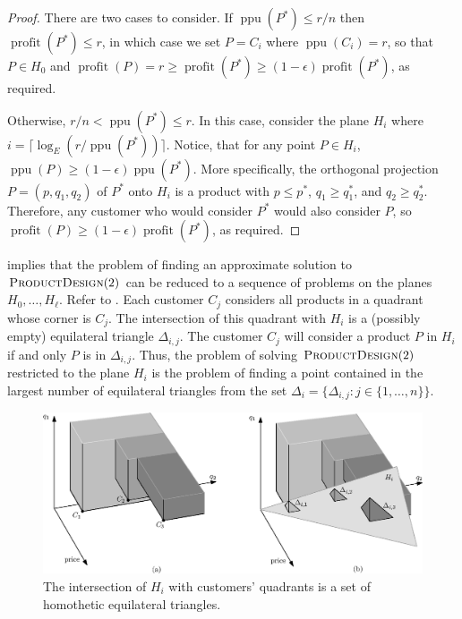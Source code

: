 \documentclass[lotsofwhite]{patmorin}
\newcommand{\ppu}{\operatorname{ppu}}
\newcommand{\val}{\operatorname{profit}}
\newcommand{\eps}{\epsilon}
\begin{document}
\begin{proof}
  There are two cases to consider.  If $\ppu(P^*) \le r/n$ then $\val(P^*)
  \le r$, in which case we set $P=C_i$ where $\ppu(C_i) = r$, so that
  $P\in H_0$ and $\val(P) = r \ge \val(P^*)\ge (1-\eps)\val(P^*)$,
  as required.

  Otherwise, $r/n < \ppu(P^*) \le r$.  In this case, consider the
  plane $H_i$ where $i = \lceil\log_E (r/\ppu(P^*))\rceil$.  Notice,
  that for any point $P\in H_i$, $\ppu(P) \ge (1-\eps)\ppu(P^*)$.
  More specifically, the orthogonal projection $P=(p,q_1,q_2)$ of $P^*$
  onto $H_i$ is a product with $p\le p^*$, $q_1\ge q_1^*$, and $q_2\ge
  q_2^*$.  Therefore, any customer who would consider $P^*$ would also
  consider $P$, so $\val(P) \ge (1-\eps)\val(P^*)$, as required.
\end{proof}

 implies that the problem of finding an approximate
solution to  $\textsc{ProductDesign}(2)$ can be reduced to a sequence of
problems on the planes $H_0,\ldots,H_\ell$.  Refer to . Each
customer $C_j$ considers all products in a quadrant whose corner is $C_j$.
The intersection of this quadrant with $H_i$ is a (possibly empty)
equilateral triangle $\Delta_{i,j}$.  The customer $C_j$ will consider
a product $P$ in $H_i$ if and only $P$ is in $\Delta_{i,j}$.  Thus,
the problem of solving $\textsc{ProductDesign}(2)$ restricted to the
plane $H_i$ is the problem of finding a point contained in the largest
number of equilateral triangles from the set $\Delta_i=\{\Delta_{i,j}:
j\in\{1,\ldots,n\}\}$.

\begin{figure}
  \begin{center}
    \includegraphics[width=\textwidth]{plane}
  \end{center}
  \caption{The intersection of $H_i$ with customers' quadrants is a
          set of homothetic equilateral triangles.}
\end{figure}
\end{document}

